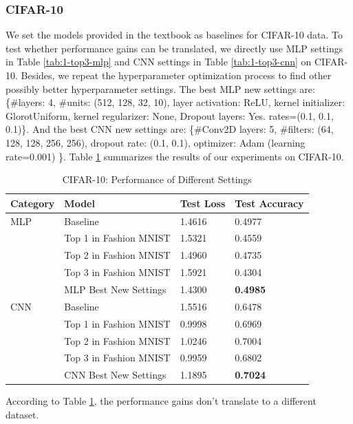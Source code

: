 \documentclass{article}
\begin{document}
\subsubsection{CIFAR-10}
We set the models provided in the textbook as baselines for CIFAR-10 data. To test whether performance gains can be translated, we directly use MLP settings in Table \ref{tab:1-top3-mlp} and CNN settings in Table \ref{tab:1-top3-cnn} on CIFAR-10. Besides, we repeat the hyperparameter optimization process to find other possibly better hyperparameter settings. The best MLP new settings are: \{\#layers: 4, \#units: (512, 128, 32, 10), layer activation: ReLU, kernel initializer: GlorotUniform, kernel regularizer: None, Dropout layers: Yes. rates=(0.1, 0.1, 0.1)\}. And the best CNN new settings are: \{\#Conv2D layers: 5, \#filters: (64, 128, 128, 256, 256), dropout rate: (0.1, 0.1), optimizer: Adam (learning rate=0.001) \}. Table \ref{tab:1-cifar} summarizes the results of our experiments on CIFAR-10.
\begin{table}[!ht]
    \centering
    \caption{CIFAR-10: Performance of Different Settings}
    \label{tab:1-cifar}
    \begin{tabular}{llll}
        \toprule
        \textbf{Category} & \textbf{Model} & \textbf{Test Loss} & \textbf{Test Accuracy}\\
        \midrule
        MLP & Baseline & 1.4616 & 0.4977\\
            & Top 1 in Fashion MNIST & 1.5321 & 0.4559\\
            & Top 2 in Fashion MNIST & 1.4960 & 0.4735\\
            & Top 3 in Fashion MNIST & 1.5921 & 0.4304\\
            & MLP Best New Settings & 1.4300 & \textbf{0.4985}\\
        \midrule
        CNN & Baseline & 1.5516 & 0.6478\\
            & Top 1 in Fashion MNIST & 0.9998 & 0.6969\\
            & Top 2 in Fashion MNIST & 1.0246 & 0.7004\\
            & Top 3 in Fashion MNIST & 0.9959 & 0.6802\\
            & CNN Best New Settings & 1.1895 & \textbf{0.7024}\\
        \bottomrule
    \end{tabular}
\end{table}
\par
According to Table \ref{tab:1-cifar}, the performance gains don't translate to a different dataset.
\end{document}
